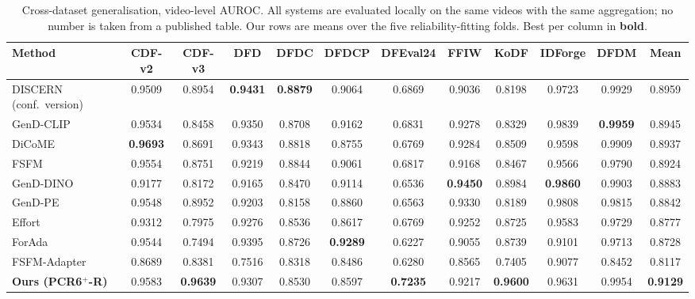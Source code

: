 \begin{table}[t]
\centering
\caption{Cross-dataset generalisation, video-level AUROC. All systems are evaluated locally on the same videos with the same aggregation; no number is taken from a published table. Our rows are means over the five reliability-fitting folds. Best per column in \textbf{bold}.}
\label{tab:crossdataset}
\setlength{\tabcolsep}{4pt}
\small
\begin{tabular}{lccccccccccc}
\toprule
Method & CDF-v2 & CDF-v3 & DFD & DFDC & DFDCP & DFEval24 & FFIW & KoDF & IDForge & DFDM & Mean \\
\midrule
DISCERN (conf.\ version) & 0.9509 & 0.8954 & \textbf{0.9431} & \textbf{0.8879} & 0.9064 & 0.6869 & 0.9036 & 0.8198 & 0.9723 & 0.9929 & 0.8959 \\
GenD-CLIP~\cite{yermakov2026deepfake} & 0.9534 & 0.8458 & 0.9350 & 0.8708 & 0.9162 & 0.6831 & 0.9278 & 0.8329 & 0.9839 & \textbf{0.9959} & 0.8945 \\
DiCoME~\cite{kang2026dicome} & \textbf{0.9693} & 0.8691 & 0.9343 & 0.8818 & 0.8755 & 0.6769 & 0.9284 & 0.8509 & 0.9598 & 0.9909 & 0.8937 \\
FSFM~\cite{wang2025fsfm} & 0.9554 & 0.8751 & 0.9219 & 0.8844 & 0.9061 & 0.6817 & 0.9168 & 0.8467 & 0.9566 & 0.9790 & 0.8924 \\
GenD-DINO~\cite{yermakov2026deepfake} & 0.9177 & 0.8172 & 0.9165 & 0.8470 & 0.9114 & 0.6536 & \textbf{0.9450} & 0.8984 & \textbf{0.9860} & 0.9903 & 0.8883 \\
GenD-PE~\cite{yermakov2026deepfake} & 0.9548 & 0.8952 & 0.9203 & 0.8158 & 0.8860 & 0.6563 & 0.9330 & 0.8189 & 0.9808 & 0.9815 & 0.8842 \\
Effort~\cite{yan2025effort} & 0.9312 & 0.7975 & 0.9276 & 0.8536 & 0.8617 & 0.6769 & 0.9252 & 0.8725 & 0.9583 & 0.9729 & 0.8777 \\
ForAda~\cite{cui2025forada} & 0.9544 & 0.7494 & 0.9395 & 0.8726 & \textbf{0.9289} & 0.6227 & 0.9055 & 0.8739 & 0.9101 & 0.9713 & 0.8728 \\
FSFM-Adapter~\cite{wang2025fsfm} & 0.8689 & 0.8381 & 0.7516 & 0.8318 & 0.8486 & 0.6280 & 0.8565 & 0.7405 & 0.9077 & 0.8452 & 0.8117 \\
\midrule
\textbf{Ours (PCR6$^+$-R)} & 0.9583 & \textbf{0.9639} & 0.9307 & 0.8530 & 0.8597 & \textbf{0.7235} & 0.9217 & \textbf{0.9600} & 0.9631 & 0.9954 & \textbf{0.9129} \\
\bottomrule
\end{tabular}
\end{table}
